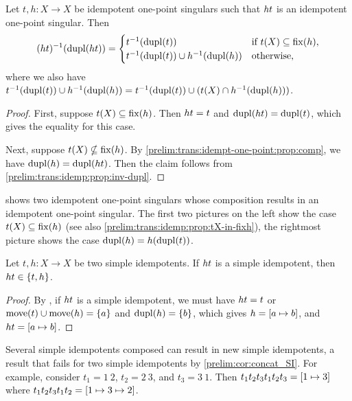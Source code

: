 \begin{corollary}
	Let $t, h \colon X \to X$ be idempotent one-point singulars
	such that $\concat{t}{h}$ is an idempotent one-point singular.
	Then
	\[
	(\concat{t}{h})^{-1}(\dupl{\concat{t}{h}})
	=
	\begin{cases}
		t^{-1}(\dupl{t}) & \text{if } t(X) \subseteq \fix{h}, \\
		t^{-1}( \dupl{t} ) \cup h^{-1}( \dupl{h} ) & \text{otherwise,}				
	\end{cases}
	\]
	where we also have $t^{-1}( \dupl{t} ) \cup h^{-1}( \dupl{h} )
	= t^{-1}( \dupl{t} ) \cup ( t(X) \cap h^{-1}( \dupl{h} ))$.
\end{corollary}
\begin{proof}
	First, suppose $t(X) \subseteq \fix{h}$.
	Then $\concat{t}{h} = t$ and $\dupl{\concat{t}{h}} = \dupl{t}$,
	which gives the equality for this case.
	
	Next, suppose $t(X) \nsubseteq \fix{h}$. By \cref{prelim:trans:idempt-one-point:prop:comp},
	we have $\dupl{h} = \dupl{\concat{t}{h}}$.
	Then the claim follows from \cref{prelim:trans:idemp:prop:inv-dupl}.
\end{proof}

\begin{remark}
	shows two idempotent one-point singulars
	whose composition results in an idempotent one-point singular.
	The first two pictures on the left show the case $t(X) \subseteq \fix{h}$ (see also \cref{prelim:trans:idemp:prop:tX-in-fixh}),
	the rightmost picture shows the case $\dupl{h} = h(\dupl{t})$.
\end{remark} 

\begin{corollary} \label{prelim:cor:concat_SI} 
	Let $t, h \colon X \to X$ be two simple idempotents.
	If $\concat{t}{h}$ is a simple idempotent,
	then $\concat{t}{h} \in \{t,h\}$.	
\end{corollary}
\begin{proof}
	By ,
	if $\concat{t}{h}$ is a simple idempotent,
	we must have $\concat{t}{h} = t$
	or $\move{t} \cup \move{h} = \{a\}$ and $\dupl{h} = \{b\}$,
	which gives $h = \SI{a}{b}$,
	and $\concat{t}{h} = \SI{a}{b}$.
\end{proof}

\begin{remark}
	Several simple idempotents composed
	can result in new simple idempotents,
	a result that fails for two simple idempotents
	by \cref{prelim:cor:concat_SI}.
	For example, consider $t_1 = \SI{1}{2}$, 
	$t_2 = \SI{2}{3}$, and $t_3 = \SI{3}{1}$.
	Then $\concat{\concat{t_3}{\concat{t_2}{t_1}}}{\concat{t_3}{\concat{t_2}{t_1}}} = \SI{1}{3}$
	where $\concat{\concat{t_2}{t_1}}{\concat{t_3}{\concat{t_2}{t_1}}} = [1 \mapsto 3 \mapsto 2]$.
\end{remark}

